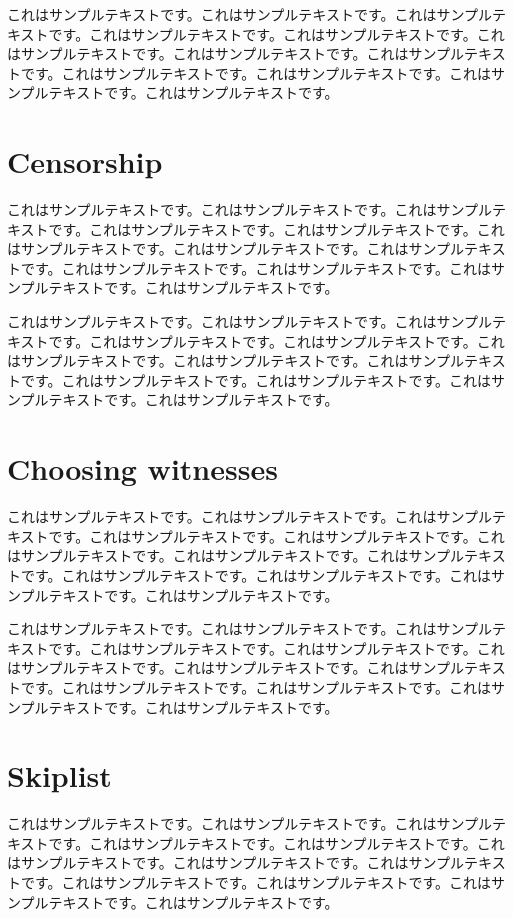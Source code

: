 \documentclass[a4paper, dvipdfmx]{jsarticle}
\begin{document}
これはサンプルテキストです。これはサンプルテキストです。これはサンプルテキストです。これはサンプルテキストです。これはサンプルテキストです。これはサンプルテキストです。これはサンプルテキストです。これはサンプルテキストです。これはサンプルテキストです。これはサンプルテキストです。これはサンプルテキストです。これはサンプルテキストです。

\section{Censorship}
これはサンプルテキストです。これはサンプルテキストです。これはサンプルテキストです。これはサンプルテキストです。これはサンプルテキストです。これはサンプルテキストです。これはサンプルテキストです。これはサンプルテキストです。これはサンプルテキストです。これはサンプルテキストです。これはサンプルテキストです。これはサンプルテキストです。

これはサンプルテキストです。これはサンプルテキストです。これはサンプルテキストです。これはサンプルテキストです。これはサンプルテキストです。これはサンプルテキストです。これはサンプルテキストです。これはサンプルテキストです。これはサンプルテキストです。これはサンプルテキストです。これはサンプルテキストです。これはサンプルテキストです。

\section{Choosing witnesses}
これはサンプルテキストです。これはサンプルテキストです。これはサンプルテキストです。これはサンプルテキストです。これはサンプルテキストです。これはサンプルテキストです。これはサンプルテキストです。これはサンプルテキストです。これはサンプルテキストです。これはサンプルテキストです。これはサンプルテキストです。これはサンプルテキストです。

これはサンプルテキストです。これはサンプルテキストです。これはサンプルテキストです。これはサンプルテキストです。これはサンプルテキストです。これはサンプルテキストです。これはサンプルテキストです。これはサンプルテキストです。これはサンプルテキストです。これはサンプルテキストです。これはサンプルテキストです。これはサンプルテキストです。

\section{Skiplist}
これはサンプルテキストです。これはサンプルテキストです。これはサンプルテキストです。これはサンプルテキストです。これはサンプルテキストです。これはサンプルテキストです。これはサンプルテキストです。これはサンプルテキストです。これはサンプルテキストです。これはサンプルテキストです。これはサンプルテキストです。これはサンプルテキストです。
\end{document}
